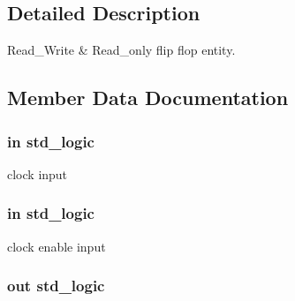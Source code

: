 \subsection{Detailed Description}
Read\+\_\+\+Write \& Read\+\_\+only flip flop entity. 

\subsection{Member Data Documentation}
\subsubsection[{\texorpdfstring{clk}{clk}}]{ {\bfseries \textcolor{vhdlchar}{in}\textcolor{vhdlchar}{ }} {\bfseries \textcolor{vhdlchar}{std\+\_\+logic}\textcolor{vhdlchar}{ }} \hspace{0.3cm}{\ttfamily [Port]}}\hypertarget{classflip__flop___r_w___r_a4a4609c199d30b3adebbeb3a01276ec5}{}\label{classflip__flop___r_w___r_a4a4609c199d30b3adebbeb3a01276ec5}


clock input 

\subsubsection[{\texorpdfstring{clk\+\_\+ena}{clk_ena}}]{ {\bfseries \textcolor{vhdlchar}{in}\textcolor{vhdlchar}{ }} {\bfseries \textcolor{vhdlchar}{std\+\_\+logic}\textcolor{vhdlchar}{ }} \hspace{0.3cm}{\ttfamily [Port]}}\hypertarget{classflip__flop___r_w___r_a373faa4fdd1aebdfb0b95d5d53da4434}{}\label{classflip__flop___r_w___r_a373faa4fdd1aebdfb0b95d5d53da4434}


clock enable input 

\subsubsection[{\texorpdfstring{data\+\_\+out}{data_out}}]{ {\bfseries \textcolor{vhdlchar}{out}\textcolor{vhdlchar}{ }} {\bfseries \textcolor{vhdlchar}{std\+\_\+logic}\textcolor{vhdlchar}{ }} \hspace{0.3cm}{\ttfamily [Port]}}\hypertarget{classflip__flop___r_w___r_a8d76ddf4f2f1e1e6689a8d706fe52c10}{}\label{classflip__flop___r_w___r_a8d76ddf4f2f1e1e6689a8d706fe52c10}


